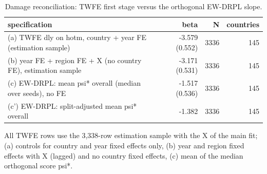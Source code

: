 \begin{table}[htbp]
\centering
\caption{Damage reconciliation: TWFE first stage versus the orthogonal EW-DRPL slope.}
\label{tab:agri_recon}
\begin{tabular}{lrrr}
\toprule
specification & beta & N & countries \\
\midrule
(a) TWFE dly on hotm, country + year FE (estimation sample) & -3.579 (0.552) & 3336 & 145 \\
(b) year FE + region FE + X (no country FE), estimation sample & -3.171 (0.531) & 3336 & 145 \\
(c) EW-DRPL: mean psi* overall (median over seeds), no FE & -1.517 (0.536) & 3336 & 145 \\
(c') EW-DRPL: split-adjusted mean psi* overall & -1.382 & 3336 & 145 \\
\bottomrule
\end{tabular}
\par\smallskip\footnotesize All TWFE rows use the 3,338-row estimation sample with the X of the main fit; (a) controls for country and year fixed effects only, (b) year and region fixed effects with X (lagged) and no country fixed effects, (c) mean of the median orthogonal score psi*.
\end{table}
